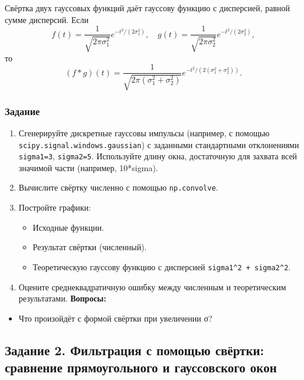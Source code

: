 \documentclass[12pt,a4paper,openany]{book}
\providecommand{\tightlist}{\setlength{\itemsep}{0pt}\setlength{\parskip}{0pt}}
\begin{document}
Свёртка двух гауссовых функций даёт гауссову функцию с дисперсией, равной сумме дисперсий. Если
\[
f(t) = \frac{1}{\sqrt{2\pi\sigma_1^2}} e^{-t^2/(2\sigma_1^2)}, \quad g(t) = \frac{1}{\sqrt{2\pi\sigma_2^2}} e^{-t^2/(2\sigma_2^2)},
\]
то
\[
(f * g)(t) = \frac{1}{\sqrt{2\pi(\sigma_1^2+\sigma_2^2)}} e^{-t^2/(2(\sigma_1^2+\sigma_2^2))}.
\]

\subsubsection*{Задание}

\begin{enumerate}
\def\labelenumi{\arabic{enumi}.}
\tightlist
\item
  Сгенерируйте дискретные гауссовы импульсы (например, с помощью \texttt{scipy.\allowbreak{}signal.\allowbreak{}windows.\allowbreak{}gaussian}) с заданными стандартными отклонениями \texttt{sigma1=\allowbreak{}3}, \texttt{sigma2=\allowbreak{}5}. Используйте длину окна, достаточную для захвата всей значимой части (например, 10*sigma).
\item
  Вычислите свёртку численно с помощью \texttt{np.\allowbreak{}convolve}.
\item
  Постройте графики:

  \begin{itemize}
  \tightlist
  \item
    Исходные функции.
  \item
    Результат свёртки (численный).
  \item
    Теоретическую гауссову функцию с дисперсией \texttt{sigma1\^{}2\ +\ sigma2\^{}2}.
  \end{itemize}
\item
  Оцените среднеквадратичную ошибку между численным и теоретическим результатами.
  \textbf{Вопросы:}
\end{enumerate}

\begin{itemize}
\tightlist
\item
  Что произойдёт с формой свёртки при увеличении σ?
\end{itemize}

\subsection*{Задание 2. Фильтрация с помощью свёртки: сравнение прямоугольного и гауссовского окон}
\end{document}
